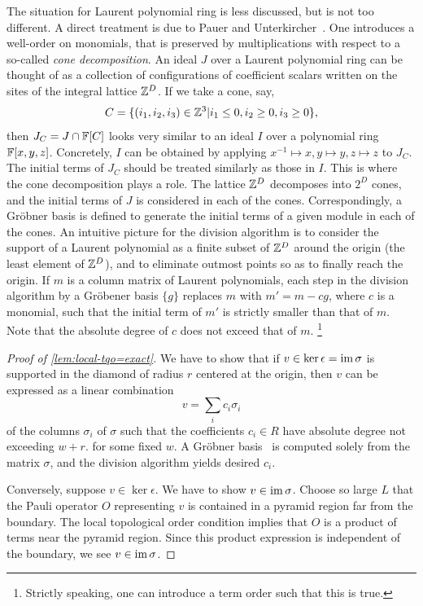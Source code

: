 The situation for Laurent polynomial ring is less discussed,
but is not too different.
A direct treatment is due to Pauer and Unterkircher~\cite{PauerUnterkircher1999}.
One introduces a well-order on monomials,
that is preserved by multiplications with respect to a so-called \emph{cone decomposition}.
An ideal $J$ over a Laurent polynomial ring can be thought of
as a collection of configurations of coefficient scalars written on the sites of the integral lattice $\mathbb{Z}^D$.
If we take a cone, say,
\[
 C = \{ (i_1,i_2,i_3) \in \mathbb{Z}^3 | i_1 \le 0, i_2 \ge 0, i_3 \ge 0 \} ,
\]
then $J_C = J \cap \mathbb{F}[C]$ looks very similar to an ideal $I$ over a polynomial ring $\mathbb{F}[x,y,z]$.
Concretely, $I$ can be obtained by applying $x^{-1} \mapsto x, y \mapsto y, z \mapsto z$ to $J_C$.
The initial terms of $J_C$ should be treated similarly as those in $I$.
This is where the cone decomposition plays a role.
The lattice $\mathbb{Z}^D$ decomposes into $2^D$ cones,
and the initial terms of $J$ is considered in each of the cones.
Correspondingly, a Gr\"obner basis is defined 
to generate the initial terms of a given module in each of the cones.
An intuitive picture for the division algorithm is 
to consider the support of a Laurent polynomial as a finite subset of $\mathbb{Z}^D$ around the origin (the least element of $\mathbb{Z}^D$),
and to eliminate outmost points so as to finally reach the origin.
If $m$ is a column matrix of Laurent polynomials,
each step in the division algorithm by a Gr\"obener basis $\{g\}$
replaces $m$ with $m' = m - c g$, where $c$ is a monomial,
such that the initial term of $m'$ is strictly smaller than that of $m$.
Note that the absolute degree of $c$ does not exceed that of $m$.%
\footnote{Strictly speaking, one can introduce a term order such that this is true.}


\begin{proof}[Proof of \ref{lem:local-tqo=exact}]
We have to show that 
if $v \in \ker \epsilon = \mathop{\mathrm{im}}\nolimits \sigma$ is supported in the diamond of radius $r$ centered at the origin,
then $v$ can be expressed as a linear combination
\[
 v = \sum_i c_i \sigma_i
\]
of the columns $\sigma_i$ of $\sigma$ 
such that the coefficients $c_i \in R$ have absolute degree not exceeding $w+r$.
for some fixed $w$.
A Gr\"obner basis~\cite{PauerUnterkircher1999} is computed solely from the matrix $\sigma$,
and the division algorithm yields desired $c_i$.

Conversely,
suppose $v \in \ker \epsilon$. We have to show $v \in \mathop{\mathrm{im}}\nolimits \sigma$.
Choose so large $L$ that the Pauli operator $O$ representing $v$ is contained
in a pyramid region far from the boundary.
The local topological order condition implies
that $O$ is a product of terms near the pyramid region.
Since this product expression is independent of the boundary,
we see $v \in \mathop{\mathrm{im}}\nolimits \sigma$.
\end{proof}


